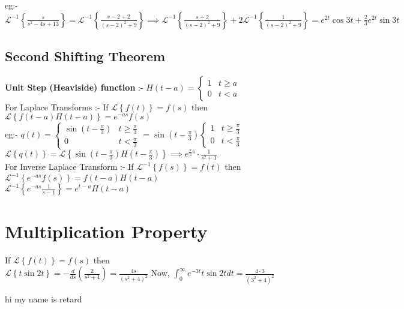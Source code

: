 \documentclass{article}
\begin{document}
eg:- $\mathcal{L}^{-1} \left \{\frac{s}{s^2-4s+13} \right \} = \mathcal{L}^{-1} \left \{ \frac{s-2+2}{(s-2)^2+9}  \right \} \implies  \mathcal{L}^{-1} \left \{ \frac{s-2}{(s-2)^2+9} \right \} + 2 \mathcal{L}^{-1} \left \{ \frac{1}{(s-2)^2+9} \right \} = e^{2t} \cos 3t + \frac{2}{3}e^{2t}\sin 3t   $

\subsection{Second Shifting Theorem}%
  \label{sub:Second Shifting Theorem}
  \textbf{Unit Step (Heaviside) function} :- $H(t-a) = \begin{cases}
    1 & t\ge a \\
    0 & t <a
  \end{cases}$ \\
  For Laplace Transforms :- 
If $\mathcal{L} \left \{f(t) \right \} = f(s)$ then $\mathcal{L} \left \{f(t-a)H(t-a) \right \} = e^{-as} f(s)  $ \\

eg:- $q(t) = \begin{cases} 
  \sin(t-\frac{\pi}{3}) & t\ge \frac{\pi}{3} \\
  0 & t<\frac{\pi}{3}
\end{cases}
= \sin(t-\frac{\pi}{3}) \begin{cases}
  1 & t \ge \frac{\pi}{3} \\
  0 & t< \frac{\pi}{3}
\end{cases}$ \\
$\mathcal{L} \left \{q(t) \right \} = \mathcal{L} \left \{\sin(t-\frac{\pi}{3}) H(t-\frac{\pi}{3}) \right \} \implies e^{\frac{\pi}{3}s}\cdot \frac{1}{s^2+1}   $ \\
For Inverse Laplace Transform :- If $\mathcal{L}^{-1} \left \{f(s) \right \} = f(t)$ then $\mathcal{L}^{-1} \left \{e^{-as} f(s)  \right \} = f(t-a)H(t-a) $ \\
$\mathcal{L}^{-1} \left \{e^{-as} \frac{1}{s-1}  \right \} = e^{t-a} H(t-a) $

\section{Multiplication Property}%
  \label{sec:Multiplication Property}
  If $\mathcal{L} \left \{f(t) \right \}   = f(s)$ then  \\
  $ \mathcal{L} \left \{t\sin 2t \right \} = - \frac{d}{ds}(\frac{2}{s^2+4})= \frac{4s}{(s^2 + 4)^2}$ Now, $\int_0^{\infty}  e^{-3t} t\sin 2t dt = \frac{4\cdot 3}{(3^2+4)^2}  $

hi my name is  retard
\end{document}
